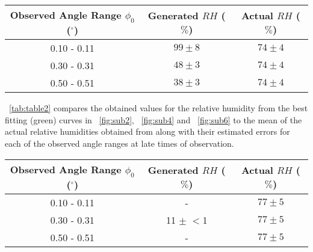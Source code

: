 \documentclass[11pt]{article}
\newcommand{\figref}[2][\figurename~]{#1\ref{#2}}
\newcommand{\tabref}[2][\tablename~]{#1\ref{#2}}
\begin{document}
\vspace{5mm}
\begin{table*}[h]
\centering %
\caption{A table comparing generated relative humidities ($RH$) from an interpolative and least squares method for the various different observed angle, $\phi_0$ ranges investigated to the mean of the actual RH values given by \cite{Web01} for the early times of observation (first 5000s).}
\label{tab:table1}
\begin{tabular}{|c|c|c|}
\hline
Observed Angle Range $\phi_0$ ($^{\circ}$) & Generated $RH$ ($\%$) & Actual $RH$ ($\%$) \cite{Web01} \\
\hline
0.10 - 0.11 & $99 \pm 8$ & $74 \pm 4$ \\
\hline
0.30 - 0.31 & $48 \pm 3$ & $74 \pm 4$ \\
\hline
0.50 - 0.51 & $38 \pm 3$ & $74 \pm 4$ \\
\hline
\end{tabular}
\end{table*}

\vspace{2mm}
\noindent
\tabref{tab:table2} compares the obtained values for the relative humidity from the best fitting (green) curves in \figref{fig:sub2}, \figref{fig:sub4} and \figref{fig:sub6} to the mean of the actual relative humidities obtained from \cite{Web01} along with their estimated errors for each of the observed angle ranges at late times of observation.

\vspace{5mm}
\begin{table*}[h]
\centering %
\caption{A table comparing generated relative humidities ($RH$) from an interpolative and least squares method for the various different observed angle, $\phi_0$ ranges investigated to the mean of the actual RH values given by \cite{Web01} for the late times of observation (last 5000s).}
\label{tab:table2}
\begin{tabular}{|c|c|c|}
\hline
Observed Angle Range $\phi_0$ ($^{\circ}$) & Generated $RH$ ($\%$) & Actual $RH$ ($\%$) \cite{Web01} \\
\hline
0.10 - 0.11 & - & $77 \pm 5$ \\
\hline
0.30 - 0.31 & 11 $\pm$ $<$1 & $77 \pm 5$ \\
\hline
0.50 - 0.51 & - & $77 \pm 5$ \\
\hline
\end{tabular}
\end{table*}
\end{document}

